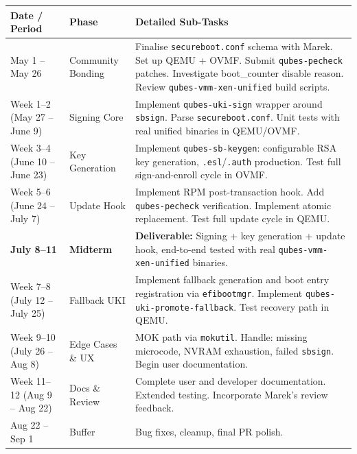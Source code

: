 \documentclass[12pt, a4paper]{article}
\begin{document}
\begin{table}[H]
\centering
\small
\begin{tabular}{p{2.5cm} p{2.8cm} p{8cm}}
\toprule
\textbf{Date / Period} & \textbf{Phase} & \textbf{Detailed Sub-Tasks} \\
\midrule
May 1 -- May 26 & Community Bonding & Finalise \texttt{secureboot.conf} schema with Marek. Set up QEMU + OVMF. Submit \texttt{qubes-pecheck} patches. Investigate boot\_counter disable reason. Review \texttt{qubes-vmm-xen-unified} build scripts. \\
\midrule
Week 1--2 \newline (May 27 -- June 9) & Signing Core & Implement \texttt{qubes-uki-sign} wrapper around \texttt{sbsign}. Parse \texttt{secureboot.conf}. Unit tests with real unified binaries in QEMU/OVMF. \\
\midrule
Week 3--4 \newline (June 10 -- June 23) & Key Generation & Implement \texttt{qubes-sb-keygen}: configurable RSA key generation, \texttt{.esl}/\texttt{.auth} production. Test full sign-and-enroll cycle in OVMF. \\
\midrule
Week 5--6 \newline (June 24 -- July 7) & Update Hook & Implement RPM post-transaction hook. Add \texttt{qubes-pecheck} verification. Implement atomic replacement. Test full update cycle in QEMU. \\
\midrule
\textbf{July 8--11} & \textbf{Midterm} & \textbf{Deliverable:} Signing + key generation + update hook, end-to-end tested with real \texttt{qubes-vmm-xen-unified} binaries. \\
\midrule
Week 7--8 \newline (July 12 -- July 25) & Fallback UKI & Implement fallback generation and boot entry registration via \texttt{efibootmgr}. Implement \texttt{qubes-uki-promote-fallback}. Test recovery path in QEMU. \\
\midrule
Week 9--10 \newline (July 26 -- Aug 8) & Edge Cases \& UX & MOK path via \texttt{mokutil}. Handle: missing microcode, NVRAM exhaustion, failed \texttt{sbsign}. Begin user documentation. \\
\midrule
Week 11--12 \newline (Aug 9 -- Aug 22) & Docs \& Review & Complete user and developer documentation. Extended testing. Incorporate Marek's review feedback. \\
\midrule
Aug 22 -- Sep 1 & Buffer & Bug fixes, cleanup, final PR polish. \\
\bottomrule
\end{tabular}
\end{table}
\end{document}
